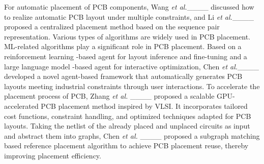 For automatic placement of PCB components, Wang \emph{et al.}____ discussed how to realize automatic PCB layout under multiple constraints, and Li \emph{et al.}____ proposed a centralized placement method based on the sequence pair representation.
Various types of algorithms are widely used in PCB placement. ML-related algorithms play a significant role in PCB placement.  Based on a reinforcement learning -based agent for layout inference and
fine-tuning and a large language model -based agent for interactive optimization, Chen \emph{et al.}____ developed a novel agent-based framework that automatically generates PCB layouts meeting industrial constraints
through user interactions. To accelerate the placement process of PCB, Zhang \emph{et al.} ____ proposed a scalable GPU-accelerated PCB placement method inspired by VLSI. It incorporates
tailored cost functions, constraint handling, and optimized techniques adapted for PCB layouts. Taking the netlist of the already placed and unplaced circuits as input and abstract them into graphs, Chen \emph{et al.} ____ proposed a subgraph matching based reference placement algorithm to achieve PCB placement reuse, thereby improving placement efficiency.




